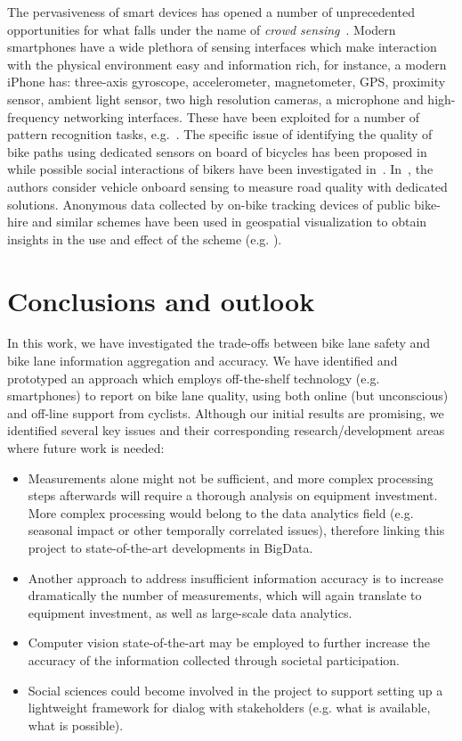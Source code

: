 \documentclass[a4paper,11pt]{article}
\begin{document}
The pervasiveness of smart devices has opened a number of unprecedented
opportunities for what falls under the name of \emph{crowd sensing}~\cite{gan:mob11}.
Modern smartphones have a wide plethora of sensing interfaces which make interaction with the physical
environment easy and information rich, for instance, a modern iPhone has: three-axis gyroscope, accelerometer, magnetometer, GPS, proximity
sensor, ambient light sensor, two high resolution cameras, a
microphone and high-frequency networking interfaces. These have been
exploited for a number of pattern recognition tasks, e.g.~\cite{fuj:iph10}. The specific issue of identifying the quality
of bike paths using dedicated sensors on board of bicycles has been
proposed in~\cite{eis:bik07} while possible social interactions of
bikers have been investigated
in~\cite{red:bik10}. In~\cite{eri:pot08}, the authors consider vehicle
onboard sensing to measure road quality with dedicated solutions.
Anonymous data collected by on-bike tracking devices of public bike-hire and similar schemes have been used in geospatial visualization to obtain insights in the use and effect of the scheme (e.g. \cite{krueger2014,wood2010}).

\section{Conclusions and outlook}

In this work, we have investigated the trade-offs between bike lane safety and bike 
lane information aggregation and accuracy. We have identified and prototyped an 
approach which employs off-the-shelf technology (e.g. smartphones) to report on bike lane quality,
using both online (but unconscious) and off-line support from cyclists. 
Although our initial results are promising, we identified several key
issues and their corresponding research/development areas where future work is needed:
 
\begin{itemize}\setlength{\itemsep}{-3pt}
\item Measurements alone might not be sufficient, and more complex processing steps afterwards
will require a thorough analysis on equipment investment. More complex processing 
would belong to the data analytics field (e.g. seasonal impact or other temporally correlated issues),
therefore linking this project to state-of-the-art developments in BigData.
\item Another approach to address insufficient information accuracy is to increase dramatically the number of 
measurements, which will again translate to equipment investment, as well as large-scale data analytics.
\item Computer vision state-of-the-art may be employed to further increase the accuracy of the information collected through
societal participation.
\item Social sciences could become involved in the project to support setting up a lightweight framework for dialog with stakeholders (e.g. what is available, what is possible). 
\end{itemize}
\end{document}

